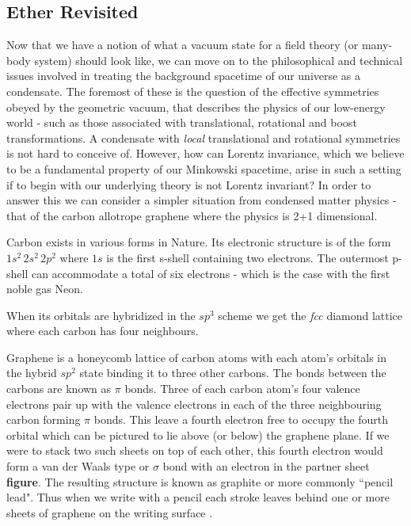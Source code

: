 \begin{doublespace}
\subsection{Ether Revisited}

Now that we have a notion of what a vacuum state for a field theory (or many-body system) should look like, we can move on to the philosophical and technical issues involved in treating the background spacetime of our universe as a condensate. The foremost of these is the question of the effective symmetries obeyed by the geometric vacuum, that describes the physics of our low-energy world - such as those associated with translational, rotational and boost transformations. A condensate with \emph{local} translational and rotational symmetries is not hard to conceive of. However, how can Lorentz invariance, which we believe to be a fundamental property of our Minkowski spacetime, arise in such a setting if to begin with our underlying theory is not Lorentz invariant? In order to answer this we can consider a simpler situation from condensed matter physics - that of the carbon allotrope graphene where the physics is 2+1 dimensional.

Carbon exists in various forms in Nature. Its electronic structure is of the form $ 1s^2 \, 2s^2 \, 2p^2 $ where $ 1s $ is the first s-shell containing two electrons. The outermost p-shell can accommodate a total of six electrons - which is the case with the first noble gas Neon.

When its orbitals are hybridized in the $ sp^3 $ scheme we get the \emph{fcc} diamond lattice where each carbon has four neighbours.

Graphene is a honeycomb lattice of carbon atoms with each atom's orbitals in the hybrid $ sp^2 $ state binding it to three other carbons. The bonds between the carbons are known as $ \pi $ bonds. Three of each carbon atom's four valence electrons pair up with the valence electrons in each of the three neighbouring carbon forming $ \pi $ bonds. This leave a fourth electron free to occupy the fourth orbital which can be pictured to lie above (or below) the graphene plane. If we were to stack two such sheets on top of each other, this fourth electron would form a van der Waals type or $ \sigma $ bond with an electron in the partner sheet \textbf{figure}. The resulting structure is known as graphite or more commonly ``pencil lead". Thus when we write with a pencil each stroke leaves behind one or more sheets of graphene on the writing surface \cite{Neto2008Electronic}.


\end{doublespace}
